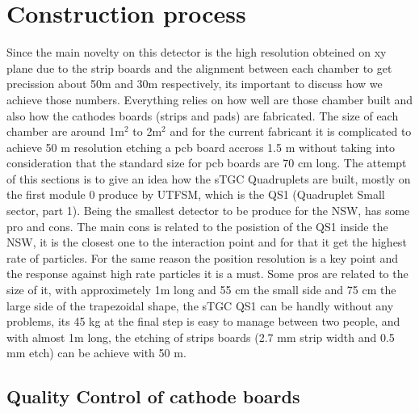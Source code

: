 \section{Construction process}
Since the main novelty on this detector is the high resolution obteined on xy plane due to the strip boards and the
alignment between each chamber to get precission about 50\micro m and 30\micro m respectively, its important to discuss
how we achieve those numbers. Everything relies on how well are those chamber built and also how the cathodes boards
(strips and pads) are fabricated. The size of each chamber are around 1m$^2$ to 2m$^2$ and for the current fabricant it
is complicated to achieve 50 \micro m resolution etching a pcb board accross 1.5 m without taking into consideration
that the standard size for pcb boards are 70 cm long.  The attempt of this sections is to give an idea how the sTGC
Quadruplets are built, mostly on the first module 0 produce by UTFSM, which is the QS1 (Quadruplet Small sector, part
1).  Being the smallest detector to be produce for the NSW, has some pro and cons. The main cons is related to the
posistion of the QS1 inside the NSW, it is the closest one to the interaction point and for that it get the highest rate
of particles. For the same reason the position resolution is a key point and the response against high rate particles it
is a must.  Some pros are related to the size of it, with approximetely 1m long and 55 cm the small side and 75 cm the
large side of the trapezoidal shape, the sTGC QS1 can be handly without any problems, its 45 kg at the final step is
easy to manage between two people, and with almost 1m long, the etching of strips boards (2.7 mm strip width and 0.5 mm
etch) can be achieve with 50 \micro m. 

\subsection{Quality Control of cathode boards}


